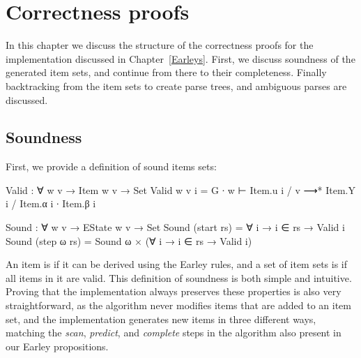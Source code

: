 
\chapter{Correctness proofs} \label{Correctness}

	In this chapter we discuss the structure of the correctness proofs for the
	implementation discussed in Chapter~\ref{Earleys}. First, we discuss
	soundness of the generated item sets, and continue from there to their
	completeness. Finally backtracking from the item sets to create parse
	trees, and ambiguous parses are discussed.

	\section{Soundness}

		First, we provide a definition of sound items sets:

		\begin{code}
			  Valid : ∀ {w v} → Item w v → Set
			  Valid {w} {v} i = G ∙ w ⊢ Item.u i / v ⟶* Item.Y i / Item.α i ∙ Item.β i
			
			  Sound : ∀ {w v} → EState w v → Set
			  Sound (start rs) = ∀ {i} → i ∈ rs → Valid i
			  Sound (step ω rs) = Sound ω × (∀ {i} → i ∈ rs → Valid i)
		\end{code}

		An item is  if it can be derived using the Earley rules,
		and a set of item sets is  if all items in it are valid.
		This definition of soundness is both simple and intuitive. Proving that
		the implementation always preserves these properties is also very
		straightforward, as the algorithm never modifies items that are added
		to an item set, and the implementation generates new items in three
		different ways, matching the \emph{scan}, \emph{predict}, and
		\emph{complete} steps in the algorithm also present in our Earley
		propositions.


